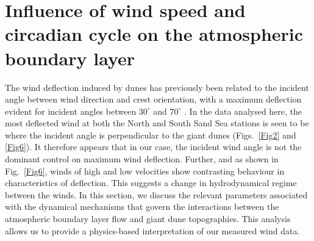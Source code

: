 \section{Influence of wind speed and circadian cycle on the atmospheric boundary layer}

The wind deflection induced by dunes has previously been related to the incident angle between wind direction and crest orientation, with a maximum deflection evident for incident angles between $30^{\circ}$ and $70^{\circ}$ \citep{Walker2009, Hesp2015}. In the data analysed here, the most deflected wind at both the North and South Sand Sea stations is seen to be where the incident angle is perpendicular to the giant dunes (Figs.~\ref{Fig2} and \ref{Fig6}). It therefore appears that in our case, the incident wind angle is not the dominant control on maximum wind deflection. Further, and as shown in Fig.~\ref{Fig6}, winds of high and low velocities show contrasting behaviour in characteristics of deflection. This suggests a change in hydrodynamical regime between the winds. In this section, we discuss the relevant parameters associated with the dynamical mechanisms that govern the interactions between the atmospheric boundary layer flow and giant dune topographies. This analysis allows us to provide a physics-based interpretation of our measured wind data.


